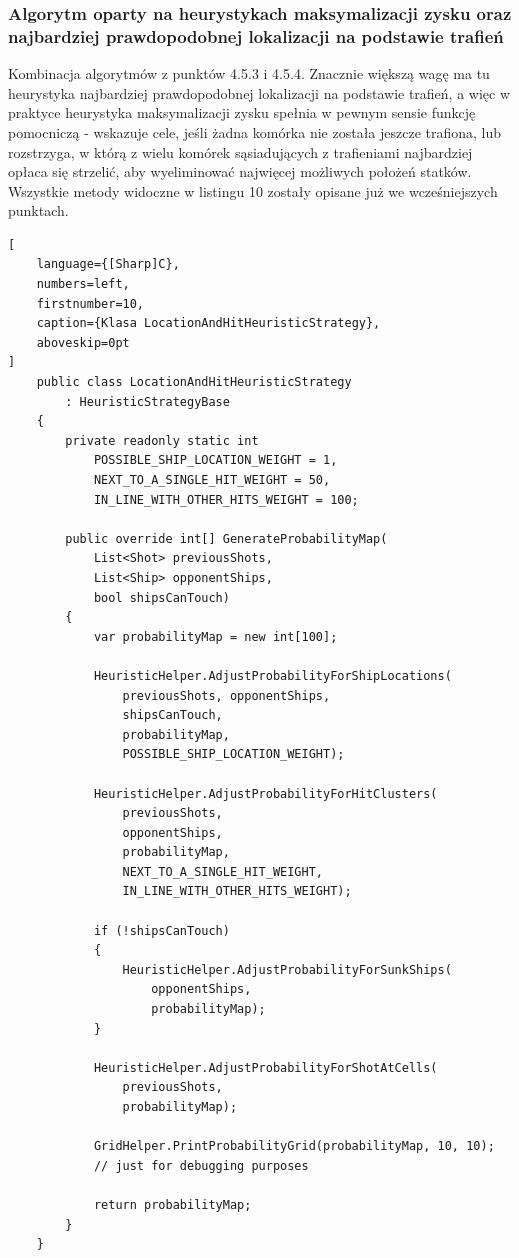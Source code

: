 \subsubsection{Algorytm oparty na heurystykach maksymalizacji zysku oraz najbardziej prawdopodobnej lokalizacji na podstawie trafień}
Kombinacja algorytmów z punktów 4.5.3 i 4.5.4. Znacznie większą wagę ma tu heurystyka najbardziej prawdopodobnej lokalizacji na podstawie trafień, a więc w praktyce heurystyka maksymalizacji zysku spełnia w pewnym sensie funkcję pomocniczą - wskazuje cele, jeśli żadna komórka nie została jeszcze trafiona, lub rozstrzyga, w którą z wielu komórek sąsiadujących z trafieniami najbardziej opłaca się strzelić, aby wyeliminować najwięcej możliwych położeń statków. Wszystkie metody widoczne w listingu 10 zostały opisane już we wcześniejszych punktach.

\begin{addmargin}[10mm]{0mm}
\begin{lstlisting}[
    language={[Sharp]C},
    numbers=left,
    firstnumber=10,
    caption={Klasa LocationAndHitHeuristicStrategy},
    aboveskip=0pt
]
    public class LocationAndHitHeuristicStrategy
        : HeuristicStrategyBase
    {
        private readonly static int
            POSSIBLE_SHIP_LOCATION_WEIGHT = 1,
            NEXT_TO_A_SINGLE_HIT_WEIGHT = 50,
            IN_LINE_WITH_OTHER_HITS_WEIGHT = 100;

        public override int[] GenerateProbabilityMap(
            List<Shot> previousShots,
            List<Ship> opponentShips,
            bool shipsCanTouch)
        {
            var probabilityMap = new int[100];

            HeuristicHelper.AdjustProbabilityForShipLocations(
                previousShots, opponentShips,
                shipsCanTouch,
                probabilityMap,
                POSSIBLE_SHIP_LOCATION_WEIGHT);

            HeuristicHelper.AdjustProbabilityForHitClusters(
                previousShots,
                opponentShips,
                probabilityMap,
                NEXT_TO_A_SINGLE_HIT_WEIGHT,
                IN_LINE_WITH_OTHER_HITS_WEIGHT);

            if (!shipsCanTouch)
            {
                HeuristicHelper.AdjustProbabilityForSunkShips(
                    opponentShips,
                    probabilityMap);
            }

            HeuristicHelper.AdjustProbabilityForShotAtCells(
                previousShots,
                probabilityMap);

            GridHelper.PrintProbabilityGrid(probabilityMap, 10, 10);
            // just for debugging purposes

            return probabilityMap;
        }
    }
\end{lstlisting}
\end{addmargin}

